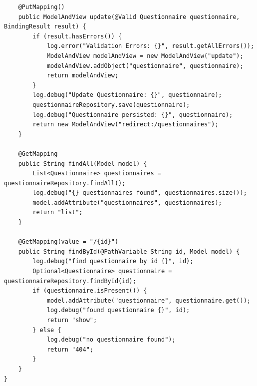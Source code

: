 \begin{verbatim}
    @PutMapping()
    public ModelAndView update(@Valid Questionnaire questionnaire, BindingResult result) {
        if (result.hasErrors()) {
            log.error("Validation Errors: {}", result.getAllErrors());
            ModelAndView modelAndView = new ModelAndView("update");
            modelAndView.addObject("questionnaire", questionnaire);
            return modelAndView;
        }
        log.debug("Update Questionnaire: {}", questionnaire);
        questionnaireRepository.save(questionnaire);
        log.debug("Questionnaire persisted: {}", questionnaire);
        return new ModelAndView("redirect:/questionnaires");
    }
 
    @GetMapping
    public String findAll(Model model) {
        List<Questionnaire> questionnaires = questionnaireRepository.findAll();
        log.debug("{} questionnaires found", questionnaires.size());
        model.addAttribute("questionnaires", questionnaires);
        return "list";
    }
 
    @GetMapping(value = "/{id}")
    public String findById(@PathVariable String id, Model model) {
        log.debug("find questionnaire by id {}", id);
        Optional<Questionnaire> questionnaire = questionnaireRepository.findById(id);
        if (questionnaire.isPresent()) {
            model.addAttribute("questionnaire", questionnaire.get());
            log.debug("found questionnaire {}", id);
            return "show";
        } else {
            log.debug("no questionnaire found");
            return "404";
        }
    }
}
\end{verbatim}